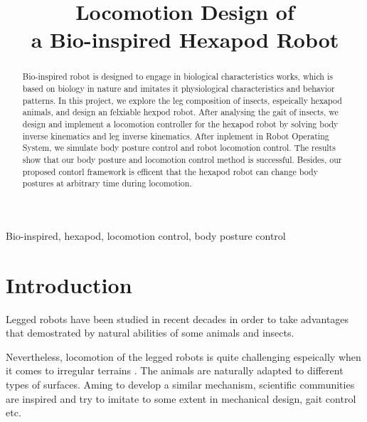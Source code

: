 \documentclass[conference]{IEEEtran}
\begin{document}
\title{Locomotion Design of \\a Bio-inspired Hexapod Robot\\}
\author{
}

\maketitle

\begin{abstract}
Bio-inspired robot is designed to engage in biological characteristics works, which is based on biology in nature and imitates it physiological characteristics and behavior
patterns. In this project, we explore the leg composition of insects, espeically hexapod animals, and design an felxiable hexpod robot. After analysing the gait of insects, we  design and implement a locomotion controller for the hexapod robot by solving body inverse kinematics and leg inverse kinematics. After inplement in Robot Operating System, we simulate body posture control and robot locomotion control. The results show that our body posture and locomotion control method is successful. Besides, our proposed contorl framework is efficent that the hexapod robot can change body postures at arbitrary time during locomotion.
\end{abstract}

\begin{IEEEkeywords}
Bio-inspired, hexapod, locomotion control, body posture control
\end{IEEEkeywords}

\section{Introduction}
Legged robots have been studied in recent decades in order to take advantages that demostrated by natural abilities of some animals and insects.

Nevertheless, locomotion of the legged robots is quite challenging espeically when it comes to irregular terrains \cite{a2}\cite{a3}. The animals are naturally adapted to different types of surfaces. Aming to develop a similar mechanism, scientific communities are inspired and try to imitate to some extent in mechanical design, gait control etc.
\end{document}
